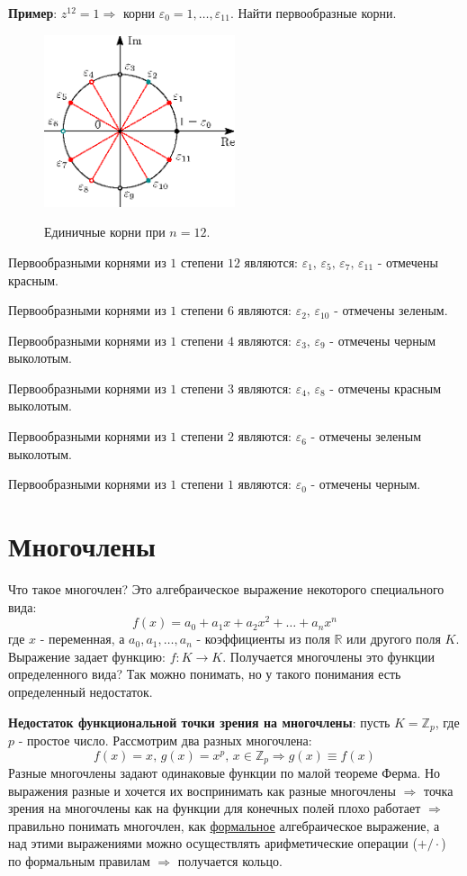 \documentclass[12pt]{article}
\newcommand{\MR}{\mathbb{R}}
\newcommand{\MZ}{\mathbb{Z}}
\newcommand{\VE}{\varepsilon}
\theoremstyle{definition}
\begin{document}
\newpage
\textbf{Пример}: $z^{12} = 1 \Rightarrow$ корни $\VE_0 = 1, \dotsc, \VE_{11}$. Найти первообразные корни.

\begin{figure}[H]
	\centering
	\includegraphics[width=0.5\textwidth]{AL1L14_5.eps}
	\label{AL1L14_5}
	\caption{Единичные корни при $n=12$.}
\end{figure}

Первообразными корнями из $1$ степени $12$ являются: $\VE_1, \, \VE_5, \, \VE_7, \, \VE_{11}$ - отмечены красным.

Первообразными корнями из $1$ степени $6$ являются: $\VE_2, \, \VE_{10}$ - отмечены зеленым.

Первообразными корнями из $1$ степени $4$ являются: $\VE_3, \, \VE_{9}$ - отмечены черным выколотым.

Первообразными корнями из $1$ степени $3$ являются: $\VE_4, \, \VE_{8}$ - отмечены красным выколотым.

Первообразными корнями из $1$ степени $2$ являются: $\VE_6$ - отмечены зеленым выколотым.

Первообразными корнями из $1$ степени $1$ являются: $\VE_0$ - отмечены черным.

\newpage
\section*{Многочлены}
Что такое многочлен? Это алгебраическое выражение некоторого специального вида:
$$
	f(x) = a_0 + a_1 x + a_2 x^2 + \dotsc + a_n x^n
$$
где $x$ - переменная, а $a_0, a_1, \dotsc, a_n$ - коэффициенты из поля $\MR$ или другого поля $K$. Выражение задает функцию: $f \colon K \to K$. Получается многочлены это функции определенного вида? Так можно понимать, но у такого понимания есть определенный недостаток.

\textbf{Недостаток функциональной точки зрения на многочлены}: пусть $K = \MZ_p$, где $p$ - простое число. Рассмотрим два разных многочлена:
$$
	f(x) = x, \, g(x) = x^p, \, x \in \MZ_p \Rightarrow g(x) \equiv f(x)
$$
Разные многочлены задают одинаковые функции по малой теореме Ферма. Но выражения разные и хочется их воспринимать как разные многочлены $\Rightarrow$ точка зрения на многочлены как на функции для конечных полей плохо работает $\Rightarrow$ правильно понимать многочлен, как \uline{формальное} алгебраическое выражение, а над этими выражениями можно осуществлять арифметические операции ($+/\cdot$) по формальным правилам $\Rightarrow$ получается кольцо.
\end{document}
